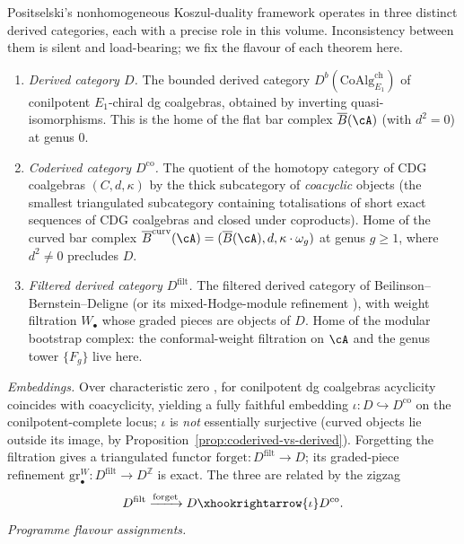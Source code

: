 \begin{remark}
\label{rem:positselski-three-derived-categories}
Positselski's nonhomogeneous Koszul-duality framework
\cite{Positselski2011} operates in three distinct derived
categories, each with a precise role in this volume.
Inconsistency between them is silent and load-bearing; we fix the
flavour of each theorem here.
\begin{enumerate}[label=\textup{(\alph*)}]
\item \emph{Derived category $D$.} The bounded derived category
 $D^b(\mathrm{CoAlg}_{E_1}^{\mathrm{ch}})$ of conilpotent
 $E_1$-chiral dg coalgebras, obtained by inverting
 quasi-isomorphisms. This is the home of the flat bar complex
 $\barB(\cA)$ (with $d^2 = 0$) at genus $0$.
\item \emph{Coderived category $D^{\mathrm{co}}$.} The quotient
 of the homotopy category of CDG coalgebras $(C, d, \kappa)$ by
 the thick subcategory of \emph{coacyclic} objects (the smallest
 triangulated subcategory containing totalisations of short
 exact sequences of CDG coalgebras and closed under coproducts).
 Home of the curved bar complex
 $\barB^{\mathrm{curv}}(\cA) = (\barB(\cA), d, \kappa \cdot
 \omega_g)$ at genus $g \ge 1$, where $d^2 \neq 0$ precludes
 $D$.
\item \emph{Filtered derived category $D^{\mathrm{filt}}$.} The
 filtered derived category of Beilinson--Bernstein--Deligne
 \cite{BBD82} (or its mixed-Hodge-module refinement
 \cite{Saito90}), with weight filtration $W_\bullet$ whose
 graded pieces are objects of $D$. Home of the modular
 bootstrap complex: the conformal-weight filtration on $\cA$
 and the genus tower $\{F_g\}$ live here.
\end{enumerate}
\emph{Embeddings.} Over characteristic zero
\cite[\S 6.1--6.3]{Positselski2011}, for conilpotent dg coalgebras
acyclicity coincides with coacyclicity, yielding a fully faithful
embedding $\iota\colon D \hookrightarrow D^{\mathrm{co}}$ on the
conilpotent-complete locus; $\iota$ is \emph{not} essentially
surjective (curved objects lie outside its image, by
Proposition~\ref*{prop:coderived-vs-derived}). Forgetting the
filtration gives a triangulated functor $\mathrm{forget}\colon
D^{\mathrm{filt}} \to D$; its graded-piece refinement
$\mathrm{gr}^W_\bullet\colon D^{\mathrm{filt}} \to
D^{\mathbb Z}$ is exact. The three are related by the zigzag
\[
 D^{\mathrm{filt}}
 \xrightarrow{\mathrm{forget}} D
 \xhookrightarrow{\iota} D^{\mathrm{co}}.
\]
\emph{Programme flavour assignments.}

\end{remark}

